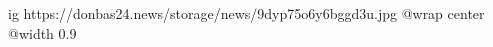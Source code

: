  
 
 
 
 

\ifcmt
  ig https://donbas24.news/storage/news/9dyp75o6y6bggd3u.jpg
  @wrap center
  @width 0.9
\fi

